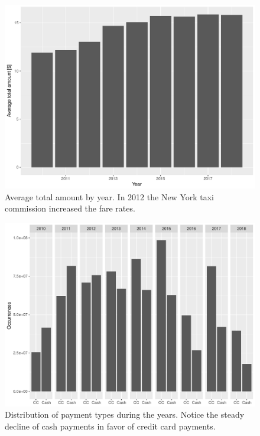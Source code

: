 \documentclass{acm_proc_article-sp-sigmod09}
\begin{document}
\begin{figure}
	\centering
	\includegraphics[width=1\columnwidth]{resources/base_plots/avg_total_amount_by_year.pdf}
	\caption{Average total amount by year. In 2012 the New York taxi commission increased the fare rates.}
	\label{fig:totalAmountByYear}
\end{figure}

\begin{figure}
	\centering
	\includegraphics[width=1\columnwidth]{resources/base_plots/payment_type_distr.pdf}
	\caption{Distribution of payment types during the years. Notice the steady decline of cash payments in favor of credit card payments.}
	\label{fig:paymentTypeByYear}
\end{figure}
\end{document}
